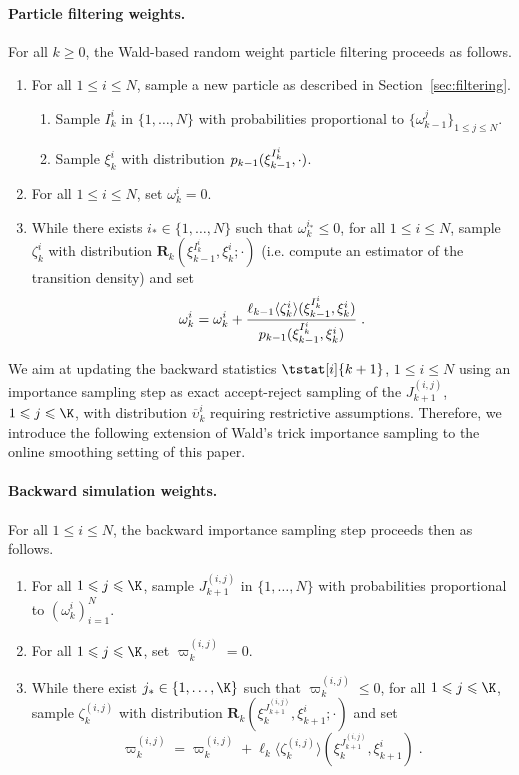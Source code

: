 \documentclass[12pt]{article}
\newcommand{\N}{N}
\newcommand{\bi}[3]{J_{#1}^{(#2, #3)}}
\newcommand{\kissforward}[3][]
{\ifthenelse{\equal{#1}{}}{p_{#2}}
{\ifthenelse{\equal{#1}{fully}}{p^{\star}_{#2}}
{\ifthenelse{\equal{#1}{smooth}}{\tilde{r}_{#2}}{\mathrm{erreur}}}}}
\newcommand{\adjfuncforward}[1]{\vartheta_{#1}}
\newcommand{\eqsp}{\;}
\newcommand{\ewght}[2]{\ensuremath{\omega_{#1}^{#2}}}
\newcommand{\epart}[2]{\ensuremath{\xi_{#1}^{#2}}}
\newcommand{\kernelmarg}{\mathbf{R}}
\newcommand{\hatqg}[1]{\mathsf{\ell}_{#1}}
\begin{document}
\paragraph{Particle filtering weights.}  
For all $k\geqslant 0$, the Wald-based random weight particle filtering proceeds as follows.
\begin{enumerate}
\item For all $1\leqslant i\leqslant \N$, sample a new particle as described in Section~\ref{sec:filtering}.
\begin{enumerate}
\item Sample $I_k^{i}$ in $\{1,\ldots,\N\}$ with probabilities proportional to $\{\ewght{k-1}{j} 
\}_{1\leqslant j\leqslant \N}$.
\item Sample $\epart{k}{i}$ with distribution $\kissforward{k-1}{k-1}(\epart{k-1}{I_k^{i}},\cdot)$.
\end{enumerate}
\item For all $1\leqslant i\leqslant \N$, set  $\ewght{k}{i}= 0$.
\item While there exists $i_* \in\{1,\ldots,\N\}$ such that $\ewght{k}{i_*} \leqslant 0$, for all $1\leqslant i\leqslant \N$, sample $\zeta_k^{i}$ with distribution $\kernelmarg_{k}(\epart{k-1}{I_k^{i}},\epart{k}{i};\cdot)$ (i.e. compute an estimator of the transition density) and set 
$$
\ewght{k}{i}  = \ewght{k}{i} + \frac{\hatqg{k-1}\langle \zeta_k^i\rangle(\epart{k-1}{I_k^{i}},\epart{k}{i}) }{\kissforward{k-1}{k-1}(\epart{k-1}{I_k^{i}},\epart{k}{i})}\eqsp.
$$
\end{enumerate}
We aim at updating the backward statistics $\tstat[i]{k+1}$, $1\leqslant i \leqslant N$ using an importance sampling step as exact accept-reject sampling of the $\bi{k+1}{i}{j}$, $1\leqslant j \leqslant \K$,  with distribution $\overline \upsilon_k^i$ requiring restrictive assumptions. Therefore, we introduce the following extension of Wald's trick importance sampling to the online smoothing setting of this paper.

\paragraph{Backward simulation weights.} For all $1\leqslant i\leqslant \N$, the backward importance sampling step proceeds then as follows.
\begin{enumerate}
\item For all $1\leqslant j\leqslant \K$,   sample $J_{k+1}^{(i,j)}$ in $\{1,\ldots, \N\}$ with probabilities proportional to  $(\omega^{i}_k)_{i=1}^{\N}$. 
\item For all $1\leqslant j\leqslant \K$, set  $\varpi_k^{(i,j)}= 0$.
\item While there exist $j_* \in\{1,\ldots,\K\}$ such that $\varpi_k^{(i,j)} \leqslant 0$, for all $1\leqslant j\leqslant \K$, sample $\zeta_k^{(i,j)}$  with distribution $\kernelmarg_{k}(\epart{k}{J_{k+1}^{(i,j)}}, \epart{k+1}{i};\cdot)$ and set 
$$
\varpi_k^{(i,j)} = \varpi_k^{(i,j)} +  \hatqg{k}\langle \zeta_k^{(i,j)} \rangle(\epart{k}{J_{k+1}^{(i,j)}}, \epart{k+1}{i})\eqsp.
$$
\end{enumerate}
\end{document}
